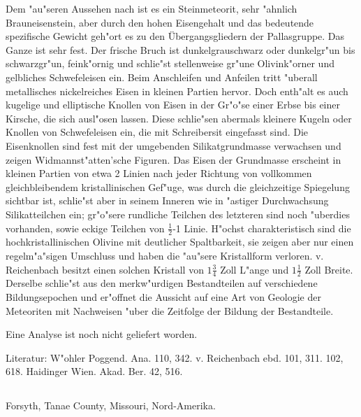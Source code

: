 \documentclass[a4paper, 11pt, oneside]{article}
\begin{document}
Dem "au"seren Aussehen nach ist es ein Steinmeteorit, sehr "ahnlich Brauneisenstein, aber durch den hohen Eisengehalt und das bedeutende spezifische Gewicht geh"ort es zu den Übergangsgliedern der Pallasgruppe. Das Ganze ist sehr fest. Der frische Bruch ist dunkelgrauschwarz oder dunkelgr"un bis schwarzgr"un, feink"ornig und schlie"st stellenweise gr"une Olivink"orner und gelbliches Schwefeleisen ein. Beim Anschleifen und Anfeilen tritt "uberall metallisches nickelreiches Eisen in kleinen Partien hervor. Doch enth"alt es auch kugelige und elliptische Knollen von Eisen in der Gr"o"se einer Erbse bis einer Kirsche, die sich ausl"osen lassen. Diese schlie"sen abermals kleinere Kugeln oder Knollen von Schwefeleisen ein, die mit Schreibersit eingefasst sind. Die Eisenknollen sind fest mit der umgebenden Silikatgrundmasse verwachsen und zeigen Widmannst"atten'sche Figuren. Das Eisen der Grundmasse erscheint in kleinen Partien von etwa 2 Linien nach jeder Richtung von vollkommen gleichbleibendem kristallinischen Gef"uge, was durch die gleichzeitige Spiegelung sichtbar ist, schlie"st aber in seinem Inneren wie in "astiger Durchwachsung Silikatteilchen ein; gr"o"sere rundliche Teilchen des letzteren sind noch "uberdies vorhanden, sowie eckige Teilchen von $\mathfrak{\frac{1}{2}}$-1 Linie. H"ochst charakteristisch sind die hochkristallinischen Olivine mit deutlicher Spaltbarkeit, sie zeigen aber nur einen regelm"a"sigen Umschluss und haben die "au"sere Kristallform verloren. v. Reichenbach besitzt einen solchen Kristall von $\mathfrak{1\frac{3}{4}}$ Zoll L"ange und $\mathfrak{1\frac{1}{2}}$ Zoll Breite. Derselbe schlie"st aus den merkw"urdigen Bestandteilen auf verschiedene Bildungsepochen und er"offnet die Aussicht auf eine Art von Geologie der Meteoriten mit Nachweisen "uber die Zeitfolge der Bildung der Bestandteile.

Eine Analyse ist noch nicht geliefert worden.

\normalsize
Literatur: W"ohler Poggend. Ana. 110, 342. v. Reichenbach ebd. 101, 311. 102, 618. Haidinger Wien. Akad. Ber. 42, 516.

\subsection{}
\LARGE
\paragraph{}
Forsyth, Tanae County, Missouri, Nord-Amerika.
\end{document}
